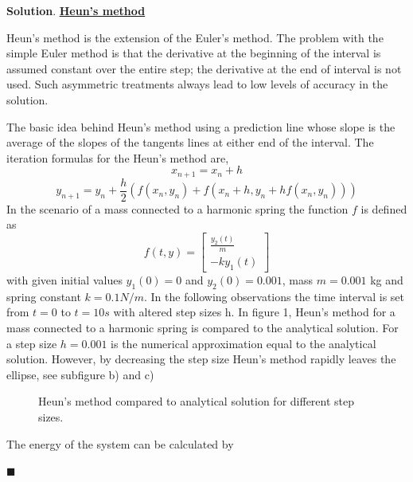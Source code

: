 \documentclass[12pt]{article}
\renewcommand{\=}[1]{\stackrel{#1}{=}} %
\theoremstyle{definition}
\newenvironment{s}{%
        \begin{trivlist} \item \textbf{Solution}. }{%
            \hspace*{\fill} $\blacksquare$\end{trivlist}}%
\begin{document}
\begin{s} \underline{\bf{Heun's method}} \par
Heun's method is the extension of the Euler's method. The problem with the simple Euler method is that the derivative at the beginning of the interval is assumed constant over the entire step; the derivative at the end of interval is not used. Such asymmetric treatments always lead to low levels of accuracy in the solution. \par
The basic idea behind Heun's method using a prediction line whose slope is the average of the slopes of the tangents lines at either end of the interval. The iteration formulas for the Heun's method are,
%
\begin{equation}
x_{n+1} = x_{n} + h
\end{equation}
%
%
\begin{equation}
y_{n+1} = y_{n} + \frac{h}{2} (f(x_{n}, y_{n}) + f(x_{n} + h, y_{n} + h f(x_{n}, y_{n})))
\end{equation}
%
In the scenario of a mass connected to a harmonic spring the function $f$ is defined as
\begin{equation}
	f(t,y) = 
	\begin{bmatrix}
		\frac{y_2(t)}{m} \\
		-ky_1 (t)
		\end{bmatrix}
\end{equation}
with given initial values $y_1 (0) = 0$ and $y_2 (0) = 0.001$, mass $m=0.001$ kg and spring constant $k=0.1 N/m$. In the following observations the time interval is set from $t=0$ to $t=10s$ with altered step sizes h.
In figure 1, Heun's method for a mass connected to a harmonic spring is compared to the analytical solution. For a step size $h=0.001$ is the numerical approximation equal to the analytical solution. However, by decreasing the step size Heun's method rapidly leaves the ellipse, see subfigure b) and c)
%
\begin{figure}[!h]
	\caption{\label{fig:my label} Heun's method compared to analytical solution for different step sizes.}
\end{figure}
%
The energy of the system can be calculated by

\end{s}
\end{document}

